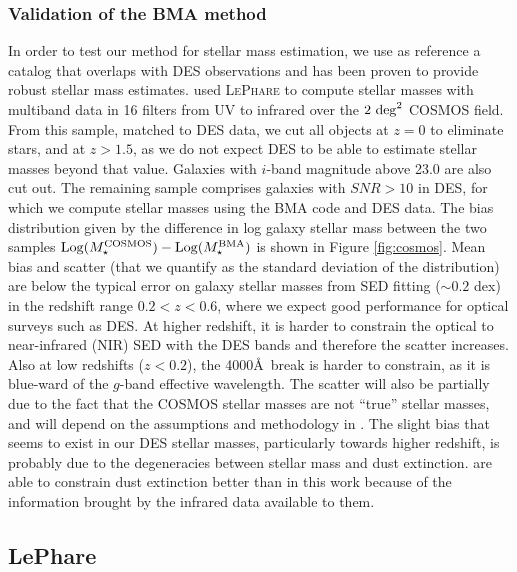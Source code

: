 \subsubsection{Validation of the BMA method}
In order to test our method for stellar mass estimation, we use as reference a catalog that overlaps with DES observations and has been proven to provide robust stellar mass estimates. \citet{laigle} used \textsc{LePhare} to compute stellar masses with multiband data in 16 filters from UV to infrared over the $2~{\rm deg}^2$ COSMOS field. From this sample, matched to DES data, we cut all objects at $z=0$ to eliminate stars, and at $z>1.5$, as we do not expect DES to be able to estimate stellar masses beyond that value.  Galaxies with  $i$-band  magnitude above 23.0 are also cut out. The remaining sample comprises galaxies with $SNR>10$ in DES, for which we compute stellar masses using the BMA code and DES data. The bias distribution given by the difference in log galaxy stellar mass between the two samples ${\rm Log}(M_\star^{\rm COSMOS})-{\rm Log}(M_\star^{\rm BMA})$ is shown in Figure \ref{fig:cosmos}. Mean bias and scatter (that we quantify as the standard deviation of the distribution) are below the typical error on galaxy stellar masses from SED fitting ($\sim 0.2$ dex) in the redshift range $0.2<z<0.6$, where we expect good performance for optical surveys such as DES. At higher redshift, it is harder to constrain the optical to near-infrared (NIR) SED with the DES bands and therefore the scatter increases. Also at low redshifts ($z<0.2$), the 4000\AA~break is harder to constrain, as it is blue-ward of the $g$-band effective wavelength. The scatter will also be partially due to the fact that the COSMOS stellar masses are not ``true'' stellar masses, and will depend on the assumptions and methodology in \citet{laigle}. The slight bias that seems to exist in our DES stellar masses, particularly towards higher redshift, is probably due to the degeneracies between stellar mass and dust extinction. \citet{laigle} are able to constrain dust extinction better than in this work because of the information brought by the infrared data available to them.


\subsection{LePhare}


